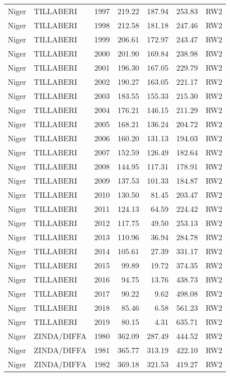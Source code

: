 \begin{longtable}{lllrrrl}
  Niger & TILLABERI & 1997 & 219.22 & 187.94 & 253.83 & RW2 \\ 
  Niger & TILLABERI & 1998 & 212.58 & 181.18 & 247.46 & RW2 \\ 
  Niger & TILLABERI & 1999 & 206.61 & 172.97 & 243.47 & RW2 \\ 
  Niger & TILLABERI & 2000 & 201.90 & 169.84 & 238.98 & RW2 \\ 
  Niger & TILLABERI & 2001 & 196.30 & 167.05 & 229.79 & RW2 \\ 
  Niger & TILLABERI & 2002 & 190.27 & 163.05 & 221.17 & RW2 \\ 
  Niger & TILLABERI & 2003 & 183.55 & 155.33 & 215.30 & RW2 \\ 
  Niger & TILLABERI & 2004 & 176.21 & 146.15 & 211.29 & RW2 \\ 
  Niger & TILLABERI & 2005 & 168.21 & 136.24 & 204.72 & RW2 \\ 
  Niger & TILLABERI & 2006 & 160.20 & 131.13 & 194.03 & RW2 \\ 
  Niger & TILLABERI & 2007 & 152.59 & 126.49 & 182.64 & RW2 \\ 
  Niger & TILLABERI & 2008 & 144.95 & 117.31 & 178.91 & RW2 \\ 
  Niger & TILLABERI & 2009 & 137.53 & 101.33 & 184.87 & RW2 \\ 
  Niger & TILLABERI & 2010 & 130.50 & 81.45 & 203.47 & RW2 \\ 
  Niger & TILLABERI & 2011 & 124.13 & 64.59 & 224.42 & RW2 \\ 
  Niger & TILLABERI & 2012 & 117.75 & 49.50 & 253.13 & RW2 \\ 
  Niger & TILLABERI & 2013 & 110.96 & 36.94 & 284.78 & RW2 \\ 
  Niger & TILLABERI & 2014 & 105.61 & 27.39 & 331.17 & RW2 \\ 
  Niger & TILLABERI & 2015 & 99.89 & 19.72 & 374.35 & RW2 \\ 
  Niger & TILLABERI & 2016 & 94.75 & 13.76 & 438.73 & RW2 \\ 
  Niger & TILLABERI & 2017 & 90.22 & 9.62 & 498.08 & RW2 \\ 
  Niger & TILLABERI & 2018 & 85.46 & 6.58 & 561.23 & RW2 \\ 
  Niger & TILLABERI & 2019 & 80.15 & 4.31 & 635.71 & RW2 \\ 
  Niger & ZINDA/DIFFA & 1980 & 362.09 & 287.49 & 444.52 & RW2 \\ 
  Niger & ZINDA/DIFFA & 1981 & 365.77 & 313.19 & 422.10 & RW2 \\ 
  Niger & ZINDA/DIFFA & 1982 & 369.18 & 321.53 & 419.27 & RW2 \\ 

\end{longtable}
